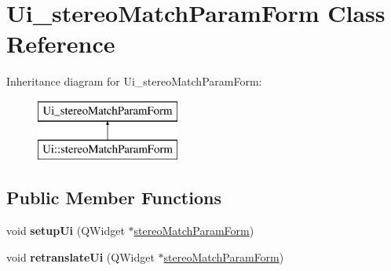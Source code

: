 \hypertarget{class_ui__stereo_match_param_form}{}\section{Ui\+\_\+stereo\+Match\+Param\+Form Class Reference}
\label{class_ui__stereo_match_param_form}
Inheritance diagram for Ui\+\_\+stereo\+Match\+Param\+Form\+:\begin{figure}[H]
\begin{center}
\leavevmode
\includegraphics[height=2.000000cm]{class_ui__stereo_match_param_form}
\end{center}
\end{figure}
\subsection*{Public Member Functions}
\begin{DoxyCompactItemize}
\item 
\hypertarget{class_ui__stereo_match_param_form_a2ee193c41bb8dc1a1d1d29ea1e630738}{}void {\bfseries setup\+Ui} (Q\+Widget $\ast$\hyperlink{classstereo_match_param_form}{stereo\+Match\+Param\+Form})\label{class_ui__stereo_match_param_form_a2ee193c41bb8dc1a1d1d29ea1e630738}

\item 
\hypertarget{class_ui__stereo_match_param_form_a6fbd6635b0b75c5016172e0aaa5118aa}{}void {\bfseries retranslate\+Ui} (Q\+Widget $\ast$\hyperlink{classstereo_match_param_form}{stereo\+Match\+Param\+Form})\label{class_ui__stereo_match_param_form_a6fbd6635b0b75c5016172e0aaa5118aa}

\end{DoxyCompactItemize}
